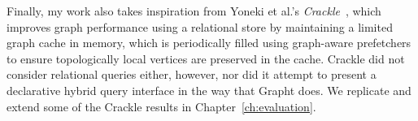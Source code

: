 Finally, my work also takes inspiration from Yoneki et al.'s
\textit{Crackle}~\cite{crackle}, which  improves graph performance using a
relational store by maintaining a limited graph cache in memory, which is
periodically filled using graph-aware prefetchers to ensure topologically
local vertices are preserved in the cache. Crackle did not consider relational
queries either, however, nor did it attempt to present a declarative hybrid
query interface in the way that Grapht does. We replicate and extend some of
the Crackle results in Chapter~\ref{ch:evaluation}.
